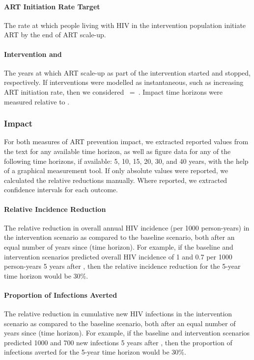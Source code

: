 \paragraph{ART Initiation Rate Target}
The rate at which people living with HIV in the intervention population initiate ART
by the end of ART scale-up.
\paragraph{Intervention  and \thinspace}
The years at which ART scale-up as part of the intervention started and stopped, respectively.
If interventions were modelled as instantaneous, such as increasing ART initiation rate,
then we considered ~=~.
Impact time horizons were measured relative to .
\subsubsection{Impact}
\label{aa:defs:impact}
For both measures of ART prevention impact,
we extracted reported values from the text for any available time horizon,
as well as figure data for any of the following time horizons, if available:
5, 10, 15, 20, 30, and 40 years, with the help of a graphical measurement tool.
If only absolute values were reported, we calculated the relative reductions manually.
Where reported, we extracted confidence intervals for each outcome.
\paragraph{Relative Incidence Reduction}
The relative reduction in overall annual HIV incidence (per 1000 person-years)
in the intervention scenario as compared to the baseline scenario,
both after an equal number of years since  (time horizon).
For example, if the baseline and intervention scenarios predicted
overall HIV incidence of 1 and 0.7 per 1000 person-years 5 years after ,
then the relative incidence reduction for the 5-year time horizon would be 30\%.
\paragraph{Proportion of Infections Averted}
The relative reduction in cumulative new HIV infections
in the intervention scenario as compared to the baseline scenario,
both after an equal number of years since  (time horizon).
For example, if the baseline and intervention scenarios predicted
1000 and 700 new infections 5 years after ,
then the proportion of infections averted for the 5-year time horizon would be 30\%.
